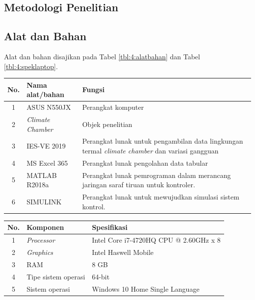 \documentclass[a4paper,10pt]{article}
\makeatletter
\newenvironment{body}{\begin{multicols}{2}}{\end{multicols}}
\renewenvironment{table}
{\def\@captype{table}%
	\captionsetup{format=plain,labelsep=newline,font=footnotesize,textfont=sc,justification=centering}%
	\fontsize{8}{8}\selectfont
}
{}
\makeatother
\begin{document}
\begin{body}
		\section{Metodologi Penelitian}
		\subsection{Alat dan Bahan}
		Alat dan bahan disajikan pada Tabel \ref{tbl:4:alatbahan} dan Tabel \ref{tbl:4:speklaptop}.
		
		\begin{table}
			\centering
			\caption{Daftar alat dan bahan}
			\label{tbl:4:alatbahan}
			\fontsize{8}{8}\selectfont
			\begin{tabularx}{\linewidth}{clX}\toprule
				No. & Nama alat/bahan & Fungsi \\
				\toprule
				1 & ASUS N550JX & Perangkat komputer \\ \midrule
				2 & \textit{Climate Chamber} & Objek penelitian \\ \midrule
				3 & IES-VE 2019 & Perangkat lunak untuk pengambilan data lingkungan termal \textit{climate chamber} dan variasi gangguan \\ \midrule
				4 & MS Excel 365 & Perangkat lunak pengolahan data tabular \\ \midrule
				5 & MATLAB R2018a & Perangkat lunak pemrograman dalam merancang jaringan saraf tiruan untuk kontroler. \\ \midrule
				6 & SIMULINK & Perangkat lunak untuk mewujudkan simulasi sistem kontrol. \\ \bottomrule
			\end{tabularx}
		\end{table}
		
		\begin{table}
			\centering
			\caption{Spesifikasi laptop ASUS N550JX}
			\label{tbl:4:speklaptop}
			\fontsize{8}{8}\selectfont
			\begin{tabularx}{\linewidth}{clX}\toprule
				No. & Komponen & Spesifikasi \\ \toprule
				1 & \textit{Processor} & Intel Core i7-4720HQ CPU @ 2.60GHz x 8 \\ \midrule
				2 & \textit{Graphics} & Intel Haswell Mobile \\ \midrule
				3 & RAM & 8 GB \\ \midrule
				4 & Tipe sistem operasi & 64-bit \\ \midrule
				5 & Sistem operasi & Windows 10 Home Single Language \\ \bottomrule
			\end{tabularx}
		\end{table}
		

\end{body}
\end{document}
